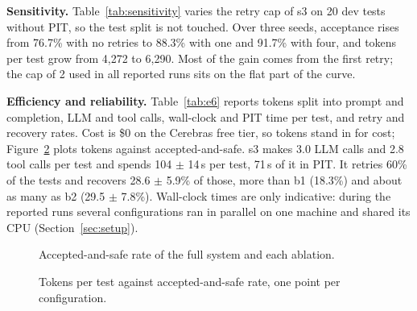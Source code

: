\textbf{Sensitivity.} Table~\ref{tab:sensitivity} varies the retry cap of \textsf{s3} on 20 dev tests without PIT, so the test split is not touched. Over three seeds, acceptance rises from 76.7\% with no retries to 88.3\% with one and 91.7\% with four, and tokens per test grow from 4{,}272 to 6{,}290. Most of the gain comes from the first retry; the cap of 2 used in all reported runs sits on the flat part of the curve.

\textbf{Efficiency and reliability.} Table~\ref{tab:e6} reports tokens split into prompt and completion, LLM and tool calls, wall-clock and PIT time per test, and retry and recovery rates. Cost is \$0 on the Cerebras free tier, so tokens stand in for cost; Figure~\ref{fig:cost} plots tokens against accepted-and-safe.
\textsf{s3} makes 3.0 LLM calls and 2.8 tool calls per test and spends 104 $\pm$ 14\,s per test, 71\,s of it in PIT. It retries 60\% of the tests and recovers 28.6 $\pm$ 5.9\% of those, more than \textsf{b1} (18.3\%) and about as many as \textsf{b2} (29.5 $\pm$ 7.8\%).
Wall-clock times are only indicative: during the reported runs several configurations ran in parallel on one machine and shared its CPU (Section~\ref{sec:setup}).

\begin{table}[t]\centering\caption{Ablation (E5): each variant's change from the full system (E3). Positive values are higher without the component.}\label{tab:ablation}\footnotesize{}\end{table}
\begin{table}[t]\centering\caption{Sensitivity to the retry cap (ES, 20 dev tests, no PIT).}\label{tab:sensitivity}\footnotesize{}\end{table}
\begin{table}[t]\centering\caption{Efficiency and reliability per configuration (E6), means over seeds. Retried: share of tests with at least one retry; Recovery: accepted among the retried.}\label{tab:e6}\footnotesize{}\end{table}
\begin{figure}[t]\centering{}\caption{Accepted-and-safe rate of the full system and each ablation.}\label{fig:ablation}\end{figure}
\begin{figure}[t]\centering{}\caption{Tokens per test against accepted-and-safe rate, one point per configuration.}\label{fig:cost}\end{figure}

